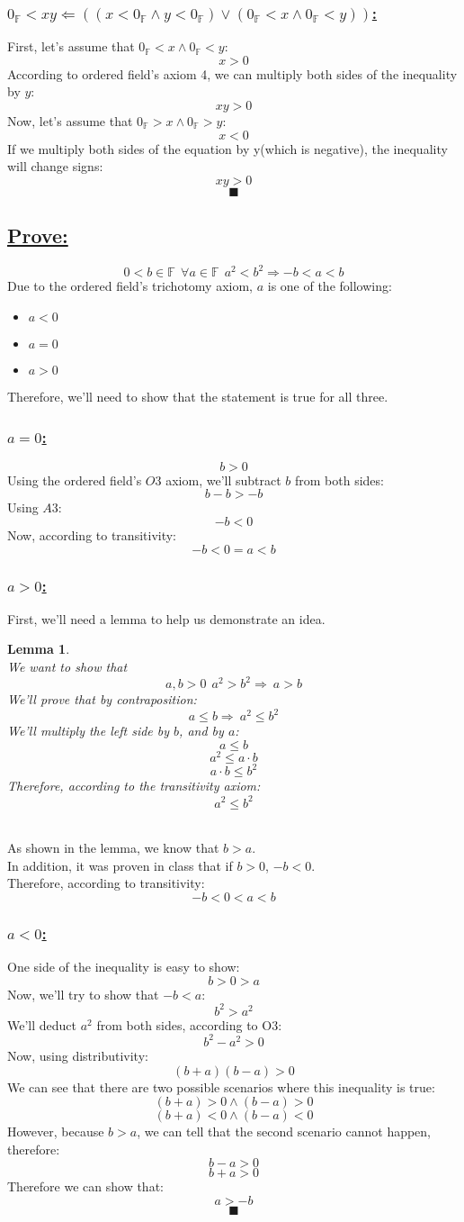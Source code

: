 \documentclass[a4paper, 12pt]{article}
\newcommand{\sub}[1]{\subsection{\underline{#1}}}
\newcommand{\subsub}[1]{\subsubsection{\underline{#1}}}
\newcommand{\?}{\stackrel{?}{=}}
\newcommand{\F}{\ensuremath{\mathbb{F}}}
\renewcommand{\qed}{$$\blacksquare$$}
\newtheorem{lemma}{Lemma}
\begin{document}
\subsub{$ 0_{\F}<xy \Longleftarrow ((x<0_{\F} \land y<0_{\F}) \lor (0_{\F} < x \land 0_{\F}<y))$:}
First, let's assume that $0_{\F} < x \land 0_{\F}<y$: $$x > 0 $$
According to ordered field's axiom 4, we can multiply both sides of the inequality by $y$: $$ xy > 0 $$
Now, let's assume that $0_{\F} > x \land 0_{\F}>y $: $$x < 0 $$
If we multiply both sides of the equation by y(which is negative), the inequality will change signs: $$ xy > 0 $$
\qed\pagebreak

\sub{Prove:}
$$ 0<b\in{\F}~~\forall{a}\in{\F}~~a^2<b^2 \Longrightarrow -b<a<b $$
Due to the ordered field's trichotomy axiom, $a$ is one of the following:
\begin{itemize}
    \item $a<0$
    \item $a=0$
    \item $a>0$
\end{itemize}
Therefore, we'll need to show that the statement is true for all three.

\subsub{$a=0$:}
$$ b>0 $$
Using the ordered field's $O3$ axiom, we'll subtract $b$ from both sides: $$ b-b > -b $$
Using $A3$: $$ -b < 0 $$
Now, according to transitivity: $$ -b < 0 = a < b $$

\subsub{$a>0$:}
First, we'll need a lemma to help us demonstrate an idea.
\begin{lemma}
    ~\\We want to show that $$ a,b>0 ~~ a^2 > b^2 \Longrightarrow~ a>b $$
    We'll prove that by contraposition: $$ a\leq{b} \Longrightarrow~ a^2\leq{b^2} $$
    We'll multiply the left side by $b$, and by $a$:
    $$ a\leq{b} $$
    $$ a^2\leq{a\cdot{b}} $$
    $$ a\cdot{b}\leq{b^2} $$
    Therefore, according to the transitivity axiom: $$ a^2 \leq{b^2} $$
\end{lemma}
\pagebreak
~\\As shown in the lemma, we know that $b>a$.\\
In addition, it was proven in class that if $b>0$, $-b<0$.\\
Therefore, according to transitivity:
$$ -b < 0 < a < b $$

\subsub{$a<0$:}
One side of the inequality is easy to show: $$ b>0>a $$
Now, we'll try to show that $-b<a$: $$ b^2 > a^2 $$
We'll deduct $a^2$ from both sides, according to O3: $$ b^2 - a^2 > 0 $$
Now, using distributivity: $$ (b+a)(b-a) > 0 $$
We can see that there are two possible scenarios where this inequality is true:
$$ (b+a) > 0 \land (b-a) > 0 $$
$$ (b+a) < 0 \land (b-a) < 0 $$
However, because $b>a$, we can tell that the second scenario cannot happen, therefore:
$$ b-a > 0 $$
$$ b+a > 0 $$
Therefore we can show that: $$ a > -b $$
\qed\pagebreak
\end{document}
